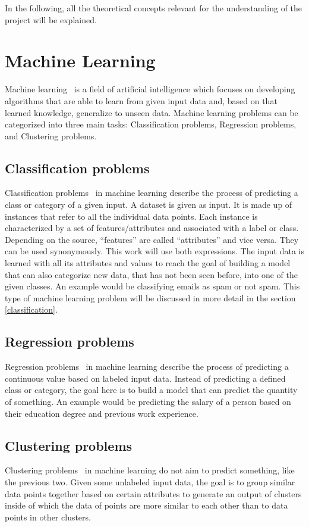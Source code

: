 
In the following, all the theoretical concepts relevant for the understanding of the project will be explained.

\section{Machine Learning}
Machine learning~\cite{machine_learning} is a field of artificial intelligence which focuses on developing algorithms that are able to learn from given input data and, based on that learned knowledge, generalize to unseen data. Machine learning problems can be categorized into three main tasks: Classification problems, Regression problems, and Clustering problems.

\subsection{Classification problems} \label{classification_problems}
Classification problems~\cite{classification_regression} in machine learning describe the process of predicting a class or category of a given input. A dataset is given as input. It is made up of instances that refer to all the individual data points. Each instance is characterized by a set of features/attributes and associated with a label or class. Depending on the source, ``features'' are called ``attributes'' and vice versa. They can be used synonymously. This work will use both expressions. The input data is learned with all its attributes and values to reach the goal of building a model that can also categorize new data, that has not been seen before, into one of the given classes. An example would be classifying emails as spam or not spam. This type of machine learning problem will be discussed in more detail in the section \ref{classification}.

\subsection{Regression problems}
Regression problems~\cite{classification_regression} in machine learning describe the process of predicting a continuous value based on labeled input data. Instead of predicting a defined class or category, the goal here is to build a model that can predict the quantity of something. An example would be predicting the salary of a person based on their education degree and previous work experience.

\subsection{Clustering problems}
Clustering problems~\cite{clustering} in machine learning do not aim to predict something, like the previous two. Given some unlabeled input data, the goal is to group similar data points together based on certain attributes to generate an output of clusters inside of which the data of points are more similar to each other than to data points in other clusters.

